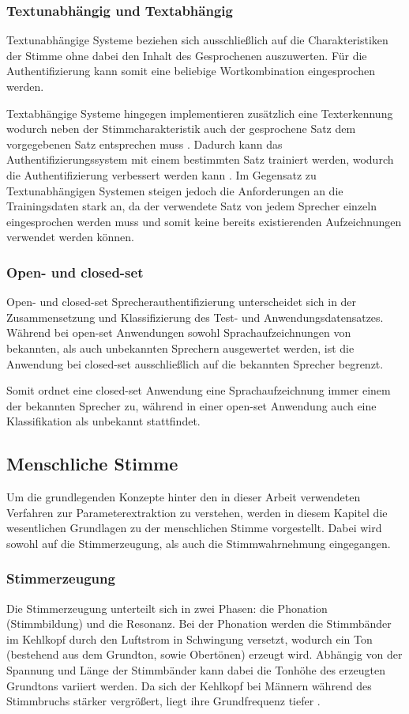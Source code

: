 \subsubsection{Textunabhängig und Textabhängig}
Textunabhängige Systeme beziehen sich ausschließlich auf die Charakteristiken der Stimme ohne dabei den Inhalt des Gesprochenen auszuwerten.
Für die Authentifizierung kann somit eine beliebige Wortkombination eingesprochen werden.

Textabhängige Systeme hingegen implementieren zusätzlich eine Texterkennung wodurch neben der Stimmcharakteristik auch der gesprochene Satz dem vorgegebenen Satz entsprechen muss \autocite[vgl.][S. 2]{thullier_text-independent_2017}.
Dadurch kann das Authentifizierungssystem mit einem bestimmten Satz trainiert werden, wodurch die Authentifizierung verbessert werden kann \autocite[vgl.][S.]{sidorov_text-independent_2010}.
Im Gegensatz zu Textunabhängigen Systemen steigen jedoch die Anforderungen an die Trainingsdaten stark an, da der verwendete Satz von jedem Sprecher einzeln eingesprochen werden muss und somit keine bereits existierenden Aufzeichnungen verwendet werden können.

\subsubsection{Open- und closed-set}
Open- und closed-set Sprecherauthentifizierung unterscheidet sich in der Zusammensetzung und Klassifizierung des Test- und Anwendungsdatensatzes.
Während bei open-set Anwendungen sowohl Sprachaufzeichnungen von bekannten, als auch unbekannten Sprechern ausgewertet werden, ist die Anwendung bei closed-set ausschließlich auf die bekannten Sprecher begrenzt.

Somit ordnet eine closed-set Anwendung eine Sprachaufzeichnung immer einem der bekannten Sprecher zu, während in einer open-set Anwendung auch eine Klassifikation als unbekannt stattfindet.

\subsection{Menschliche Stimme}
Um die grundlegenden Konzepte hinter den in dieser Arbeit verwendeten Verfahren zur Parameterextraktion zu verstehen, werden in diesem Kapitel die wesentlichen Grundlagen zu der menschlichen Stimme vorgestellt.
Dabei wird sowohl auf die Stimmerzeugung, als auch die Stimmwahrnehmung eingegangen.

\subsubsection{Stimmerzeugung}
Die Stimmerzeugung unterteilt sich in zwei Phasen: die Phonation (Stimmbildung) und die Resonanz.
Bei der Phonation werden die Stimmbänder im Kehlkopf durch den Luftstrom in Schwingung versetzt, wodurch ein Ton (bestehend aus dem Grundton, sowie Obertönen) erzeugt wird.
Abhängig von der Spannung und Länge der Stimmbänder kann dabei die Tonhöhe des erzeugten Grundtons variiert werden.
Da sich der Kehlkopf bei Männern während des Stimmbruchs stärker vergrößert, liegt ihre Grundfrequenz tiefer \autocite[vgl.][S. 278-279]{clauss_humanbiologie_2018}.


